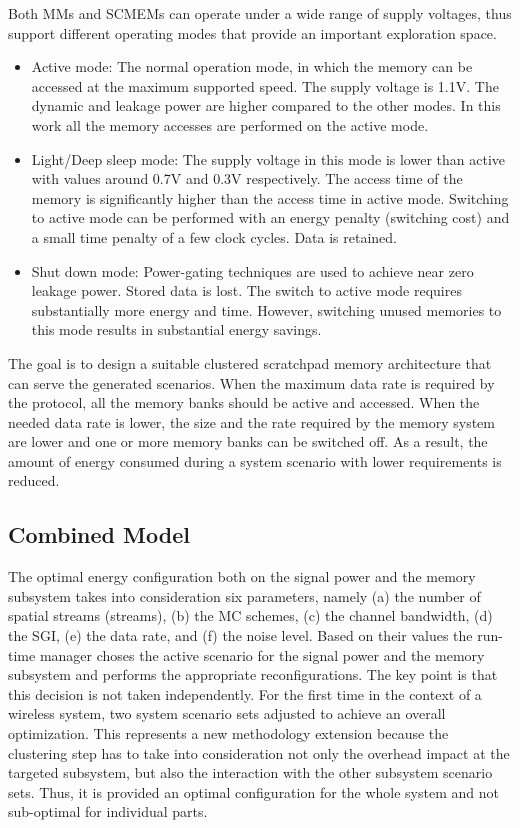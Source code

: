 Both MMs and SCMEMs can operate under a wide range of supply voltages, thus support different operating modes that provide an important exploration space. 
\begin{itemize}
\item Active mode: The normal operation mode, in which the memory can be accessed at the maximum supported speed. The supply voltage is 1.1V. The dynamic and leakage power are higher compared to the other modes. In this work all the memory accesses are performed on the active mode.
\item Light/Deep sleep mode: The supply voltage in this mode is lower than active with values around 0.7V and 0.3V respectively. The access time of the memory is significantly higher than the access time in active mode. Switching to active mode can be performed with an energy penalty (switching cost) and a small time penalty of a few clock cycles. Data is retained.
\item Shut down mode: Power-gating techniques are used to achieve near zero leakage power. Stored data is lost. The switch to active mode requires substantially more energy and time. However, switching unused memories to this mode results in substantial energy savings.
\end{itemize}

	The goal is to design a suitable clustered scratchpad memory architecture that can serve the generated scenarios. When the maximum data rate is required by the protocol, all the memory banks should be active and accessed. When the needed data rate is lower, the size and the rate required by the memory system are lower and one or more memory banks can be switched off. As a result, the amount of energy consumed during a system scenario with lower requirements is reduced.
	
\subsection{Combined Model}	

The optimal energy configuration both on the signal power and the memory subsystem takes into consideration six parameters, namely (a) the number of spatial streams (streams), (b) the MC schemes, (c) the channel bandwidth, (d) the SGI, (e) the data rate, and (f) the noise level. Based on their values the run-time manager choses the active scenario for the signal power and the memory subsystem and performs the appropriate reconfigurations. The key point is that this decision is not taken independently. For the first time in the context of a wireless system, two system scenario sets adjusted to achieve an overall optimization. This represents a new methodology extension because the clustering step has to take into consideration not only the overhead impact at the targeted subsystem, but also the interaction with the other subsystem scenario sets. Thus, it is provided an optimal configuration for the whole system and not sub-optimal for individual parts.

